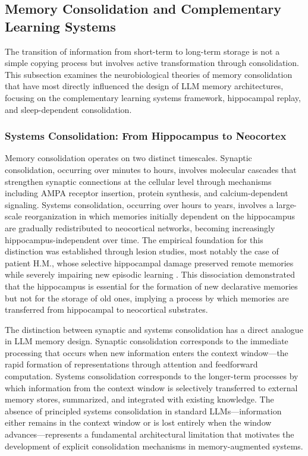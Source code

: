 \documentclass[11pt,letterpaper]{article}
\begin{document}
\subsection{Memory Consolidation and Complementary Learning Systems}

The transition of information from short-term to long-term storage is not a simple copying process but involves active transformation through consolidation. This subsection examines the neurobiological theories of memory consolidation that have most directly influenced the design of LLM memory architectures, focusing on the complementary learning systems framework, hippocampal replay, and sleep-dependent consolidation.

\subsubsection{Systems Consolidation: From Hippocampus to Neocortex}

Memory consolidation operates on two distinct timescales. Synaptic consolidation, occurring over minutes to hours, involves molecular cascades that strengthen synaptic connections at the cellular level through mechanisms including AMPA receptor insertion, protein synthesis, and calcium-dependent signaling. Systems consolidation, occurring over hours to years, involves a large-scale reorganization in which memories initially dependent on the hippocampus are gradually redistributed to neocortical networks, becoming increasingly hippocampus-independent over time. The empirical foundation for this distinction was established through lesion studies, most notably the case of patient H.M., whose selective hippocampal damage preserved remote memories while severely impairing new episodic learning \cite{squire1991medial}. This dissociation demonstrated that the hippocampus is essential for the formation of new declarative memories but not for the storage of old ones, implying a process by which memories are transferred from hippocampal to neocortical substrates.

The distinction between synaptic and systems consolidation has a direct analogue in LLM memory design. Synaptic consolidation corresponds to the immediate processing that occurs when new information enters the context window---the rapid formation of representations through attention and feedforward computation. Systems consolidation corresponds to the longer-term processes by which information from the context window is selectively transferred to external memory stores, summarized, and integrated with existing knowledge. The absence of principled systems consolidation in standard LLMs---information either remains in the context window or is lost entirely when the window advances---represents a fundamental architectural limitation that motivates the development of explicit consolidation mechanisms in memory-augmented systems.
\end{document}
